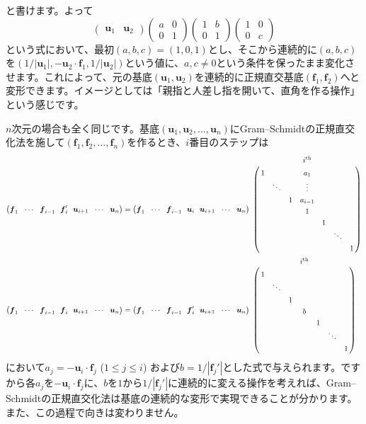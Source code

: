 と書けます。よって
\[
\begin{pmatrix}
\bm{u}_1 & \bm{u}_2
\end{pmatrix}
\begin{pmatrix}
a & 0 \\
0 & 1
\end{pmatrix}\begin{pmatrix}
1 & b \\
0 & 1
\end{pmatrix}
\begin{pmatrix}
1 & 0 \\
0 & c
\end{pmatrix}
\]
という式において、最初$(a, b ,c) = (1, 0, 1)$とし、そこから連続的に$(a, b, c)$を$(1/|\bm{u}_1|, -\bm{u}_2 \cdot \bm{f}_1, 1/|\bm{u}_2|)$という値に、$a, c \neq 0$という条件を保ったまま変化させます。これによって、元の基底$(\bm{u}_1, \bm{u}_2)$を連続的に正規直交基底$(\bm{f}_1, \bm{f}_2)$へと変形できます。イメージとしては「親指と人差し指を開いて、直角を作る操作」という感じです。

$n$次元の場合も全く同じです。基底$(\bm{u}_1, \bm{u}_2, \ldots, \bm{u}_n)$にGram--Schmidtの正規直交化法を施して$(\bm{f}_1, \bm{f}_2, \ldots, \bm{f}_n)$を作るとき、$i$番目のステップは
\begin{align*}
\bigl(\bm{f}_1 \ \  \cdots \ \  \bm{f}_{i - 1} \ \  \bm{f}_i' \ \  \bm{u}_{i + 1} \ \  \cdots \ \  \bm{u}_n \bigr)
&=
\bigl(\bm{f}_1 \ \  \cdots \ \  \bm{f}_{i - 1} \ \  \bm{u}_i \ \  \bm{u}_{i + 1} \ \  \cdots \ \  \bm{u}_n \bigr)
\bordermatrix{
& & & & i^{\text{th}} \\
& 1 & & & a_1 \\
& & \ddots & & \vdots \\
& & & 1 & a_{i - 1} \\
& & & & 1 \\
& & & & & 1 \\
& & & & & & \ddots \\
& & & & & & & 1
}
\\
\bigl(\bm{f}_1 \ \  \cdots \ \  \bm{f}_{i - 1} \ \  \bm{f}_i \ \  \bm{u}_{i + 1} \ \  \cdots \ \  \bm{u}_n \bigr)
&=
\bigl(\bm{f}_1 \ \  \cdots \ \  \bm{f}_{i - 1} \ \  \bm{f}_i' \ \  \bm{u}_{i + 1} \ \  \cdots \ \  \bm{u}_n \bigr)
\bordermatrix{
& & & & i^{\text{th}} \\
& 1 & \\
& & \ddots \\
& & & 1 \\
& & & & b \\
& & & & & 1 \\
& & & & & & \ddots \\
& & & & & & & 1
}
\end{align*}
において$a_j = - \bm{u}_i \cdot \bm{f}_j$ ($1 \leq j \leq i$) および$b = 1/|\bm{f}_j'|$とした式で与えられます。ですから各$a_j$を$- \bm{u}_i \cdot \bm{f}_j$に、$b$を$1$から$1/|\bm{f}_j'|$に連続的に変える操作を考えれば、Gram--Schmidtの正規直交化法は基底の連続的な変形で実現できることが分かります。また、この過程で向きは変わりません。

